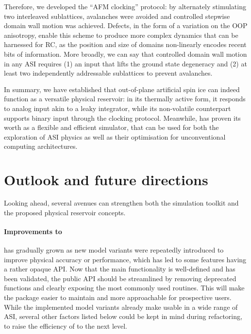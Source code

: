 Therefore, we developed the ``AFM clocking'' protocol: by alternately stimulating two interleaved sublattices, avalanches were avoided and controlled stepwise domain wall motion was achieved.
Defects, in the form of a variation on the OOP anisotropy, enable this scheme to produce more complex dynamics that can be harnessed for RC, as the position and size of domains non-linearly encodes recent bits of information.
More broadly, we can say that controlled domain wall motion in any ASI requires (1) an input that lifts the ground state degeneracy and (2) at least two independently addressable sublattices to prevent avalanches. \\\par

In summary, we have established that out-of-plane artificial spin ice can indeed function as a versatile physical reservoir: in its thermally active form, it responds to analog input akin to a leaky integrator, while its non-volatile counterpart supports binary input through the clocking protocol. %
Meanwhile, \hotspice has proven its worth as a flexible and efficient simulator, that can be used for both the exploration of ASI physics as well as their optimisation for unconventional computing architectures.

\newpage
\section{Outlook and future directions}
Looking ahead, several avenues can strengthen both the \hotspice simulation toolkit and the proposed physical reservoir concepts.

\paragraph{Improvements to \hotspice}
\hotspice has gradually grown as new model variants were repeatedly introduced to improve physical accuracy or performance, which has led to some features having a rather opaque API.
Now that the main functionality is well-defined and has been validated, the public API should be streamlined by removing deprecated functions and clearly exposing the most commonly used routines. %
This will make the package easier to maintain and more approachable for prospective users.
While the implemented model variants already make \hotspice usable in a wide range of ASI, several other factors listed below could be kept in mind during refactoring, to raise the efficiency of \hotspice to the next level. \\\par

